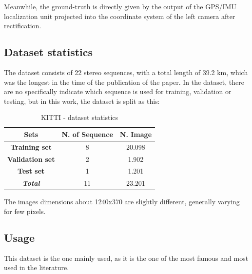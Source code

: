 Meanwhile, the ground-truth is directly given by the output of the GPS/IMU localization unit projected into the coordinate system of the left camera after rectification.

\subsection{Dataset statistics}\label{subsec:kitti-dataset-statistics}
The dataset consists of 22 stereo sequences, with a total length of 39.2 km, which was the longest in the time of the publication of the paper.
In the dataset, there are no specifically indicate which sequence is used for training, validation or testing, but in this work, the dataset is split as this:
\begin{table}[H]
    \centering
    \begin{tabular}{|c|c|c|}
        \hline
        \textbf{Sets}           & \textbf{N. of Sequence} & \textbf{N. Image} \\ \hline
        \textbf{Training set}   & 8                       & 20.098            \\ \hline
        \textbf{Validation set} & 2                       & 1.902             \\ \hline
        \textbf{Test set}       & 1                       & 1.201             \\ \hline
        \textit{\textbf{Total}} & 11                      & 23.201            \\ \hline
    \end{tabular}\caption{KITTI - dataset statistics}\label{tab:kitti-dataset-statistics}
\end{table}

The images dimensions about 1240x370 are slightly different, generally varying for few pixels.
\subsection{Usage}\label{subsec:kitti-usage}

This dataset is the one mainly used, as it is the one of the most famous and most used in the literature.

